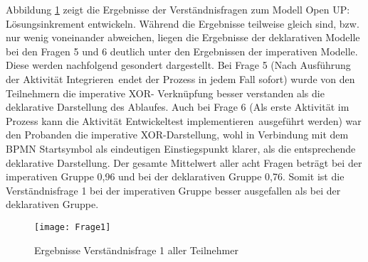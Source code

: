 Abbildung \ref{fig:Frage1} zeigt die Ergebnisse der Verständnisfragen zum Modell \grqq Open UP: Lösungsinkrement entwickeln\grqq. Während die Ergebnisse teilweise gleich sind, bzw. nur wenig voneinander abweichen, liegen die Ergebnisse der deklarativen Modelle bei den Fragen 5 und 6 deutlich unter den Ergebnissen der imperativen Modelle. Diese werden nachfolgend gesondert dargestellt. \newline
Bei Frage 5 (\grqq Nach Ausführung der Aktivität \grqq Integrieren\grqq \ endet der Prozess in jedem Fall sofort\grqq) wurde von den Teilnehmern die imperative XOR- Verknüpfung besser verstanden als die deklarative Darstellung des Ablaufes. Auch bei Frage 6 (\grqq Als erste Aktivität im Prozess kann die Aktivität \grqq Entwickeltest implementieren\grqq \ ausgeführt werden\grqq) war den Probanden die imperative XOR-Darstellung, wohl in Verbindung mit dem BPMN Startsymbol als eindeutigen Einstiegspunkt klarer, als die entsprechende deklarative Darstellung.\newline
Der gesamte Mittelwert aller acht Fragen beträgt bei der imperativen Gruppe 0,96 und bei der deklarativen Gruppe 0,76. Somit ist die Verständnisfrage 1 bei der imperativen Gruppe besser ausgefallen als bei der deklarativen Gruppe. \newline

\begin{figure}[htp]
\begin{center}
  \texttt{[image: Frage1]} %
  \caption{Ergebnisse Verständnisfrage 1 aller Teilnehmer}
  \label{fig:Frage1}
\end{center}
\end{figure}


